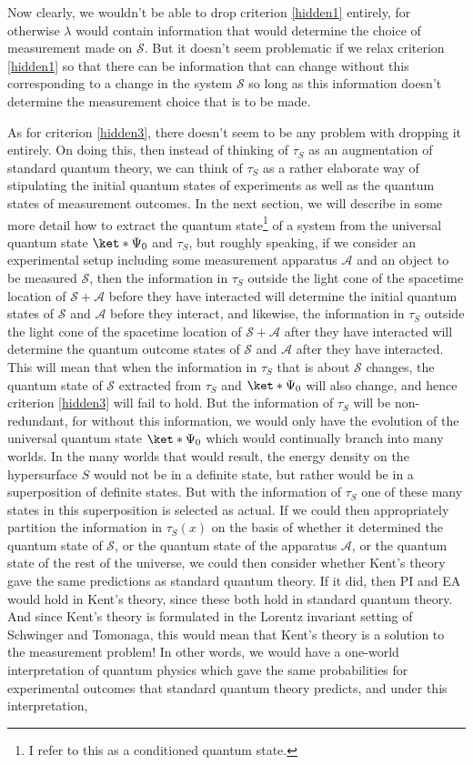 \documentclass[12pt]{report}
\begin{document}
Now clearly, we wouldn't be able to drop criterion \ref{hidden1} entirely, for otherwise $\lambda$ would contain information that would determine the choice of measurement made on $\mathcal{S}$. But it doesn't seem problematic if we relax criterion \ref{hidden1} so that there can be information that can change without this corresponding to a change in the system $\mathcal{S}$ so long as this information doesn't determine the measurement choice that is to be made. 

As for criterion \ref{hidden3}, there doesn't seem to be any problem with dropping it entirely. On doing this, then instead of thinking of $\tau_S$ as an augmentation of standard quantum theory, we can think of $\tau_S$ as a rather elaborate way of stipulating the initial quantum states of experiments as well as the quantum states of measurement outcomes. In the next section, we will describe in some more detail how to extract the quantum state\footnote{I refer to this as a conditioned quantum state.} of a system from the universal quantum state $\ket*{\Psi_0}$ and $\tau_S$, but roughly speaking, if we consider an experimental setup including some measurement apparatus $\mathcal{A}$ and an object to be measured $\mathcal{S}$, then the information in  $\tau_S$ outside the light cone of the spacetime location of $\mathcal{S}+\mathcal{A}$ before they have interacted will determine the initial quantum states of $\mathcal{S}$ and $\mathcal{A}$ before they interact, and likewise, the information in  $\tau_S$ outside the light cone of the spacetime location of $\mathcal{S}+\mathcal{A}$ after they have interacted will determine the quantum outcome states of $\mathcal{S}$ and $\mathcal{A}$ after they have interacted. This will mean that when the information in $\tau_S$ that is about $\mathcal{S}$ changes, the quantum state of $\mathcal{S}$ extracted from $\tau_S$ and   $\ket*{\Psi_0}$ will also change, and hence criterion \ref{hidden3} will fail to hold. But the information of $\tau_S$ will be non-redundant, for without this information, we would only have the evolution of the universal quantum state $\ket*{\Psi_0}$ which would continually branch into many worlds. In the many worlds that would result, the energy density on the hypersurface $S$ would not be in a definite state, but rather would be in a superposition of definite states. But with the information of $\tau_S$ one of these many states in this superposition is selected as actual. If we could then appropriately partition the information in $\tau_S(x)$ on the basis of whether it determined the quantum state of $\mathcal{S}$, or the quantum state of the apparatus $\mathcal{A}$, or the quantum state of the rest of the universe, we could then consider whether Kent's theory gave the same predictions as standard quantum theory. If it did, then PI and EA would hold in Kent's theory, since these both hold in standard quantum theory. And since Kent's theory is formulated in the Lorentz invariant setting of Schwinger and Tomonaga, this would mean that Kent's theory is a solution to the measurement problem! In other words, we would have a one-world interpretation of quantum physics which gave the same probabilities for experimental outcomes that standard quantum theory predicts, and under this interpretation, 
\end{document}
